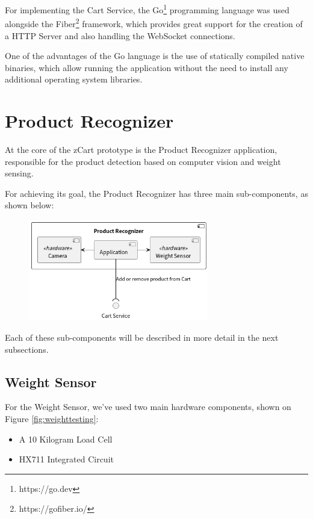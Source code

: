 \documentclass[openright]{normas-utf-tex} %
\begin{document}
For implementing the Cart Service, the Go\footnote{https://go.dev} programming
language was used alongside the Fiber\footnote{https://gofiber.io/} framework,
which provides great support for the creation of a HTTP Server and also
handling the WebSocket connections.

One of the advantages of the Go language is the use of statically compiled
native binaries, which allow running the application without the need to
install any additional operating system libraries. 

\section{Product Recognizer}

At the core of the zCart prototype is the Product Recognizer application,
responsible for the product detection based on computer vision and weight
sensing.

For achieving its goal, the Product Recognizer has three main sub-components, as shown below:
\begin{figure}[H]
	\centering
	\includegraphics[width=0.7\textwidth]{./images/diagrams/ProductRecognizer.png}
	\caption[]{}
	\label{fig:dummy}
\end{figure}

Each of these sub-components will be described in more detail in the next subsections.

\subsection{Weight Sensor}

For the Weight Sensor, we've used two main hardware components, shown on Figure \ref{fig:weighttesting}:
\begin{itemize}
    \item  A 10 Kilogram Load Cell
    \item HX711 Integrated Circuit
\end{itemize}
\end{document}
